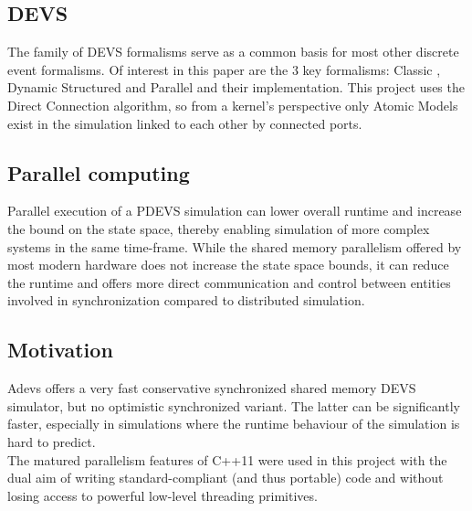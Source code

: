 \subsection{DEVS}
The family of DEVS \cite{DEVSbase} formalisms serve as a common basis for most other discrete event formalisms. Of interest in this paper are the 3 key formalisms: Classic \cite{ClassicDEVS}, Dynamic Structured \cite{DSDEVS} and Parallel \cite{ParallelDEVS} and their implementation. This project uses the Direct Connection \cite{SymbolicFlattening} algorithm, so from a kernel's perspective only Atomic Models exist in the simulation linked to each other by connected ports.

\subsection{Parallel computing}
Parallel execution of a PDEVS simulation can lower overall runtime and increase the bound on the state space, thereby enabling simulation of more complex systems in the same time-frame.
While the shared memory parallelism offered by most modern hardware does not increase the state space bounds, it can reduce the runtime and offers more direct communication and control between entities involved in synchronization compared to distributed simulation. \\

\subsection{Motivation}
Adevs \cite{adevs} offers a very fast conservative synchronized shared memory DEVS simulator, but no optimistic synchronized variant. 
The latter can be significantly faster, especially in simulations where the runtime behaviour of the simulation is hard to predict. \\
The matured parallelism features of C++11 were used in this project with the dual aim of writing standard-compliant (and thus portable) code and without losing access to powerful low-level threading primitives. %

